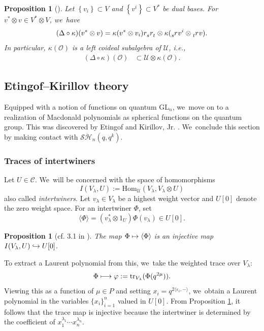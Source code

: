 \documentclass[11pt]{article}
\newcommand{\ie}{i.e.,\xspace}
\newcommand{\cf}{cf.\xspace}
\let\epsilon\varepsilon
\newcommand\mto{\mathchoice{\longmapsto}{\mapsto}{\mapsto}{\mapsto}}
\newcommand\hto{\mathrel{\lhook\joinrel\to}}
\newcommand{\GL}{\mathrm{GL}}
\newtheorem{prop}[thm]{Proposition}
\theoremstyle{definition}
\newcommand{\OO}{\mathcal{O}}
\newcommand{\SHH}{\mathcal{S}\ddot{\mathcal{H}}}
\begin{document}
\begin{prop}[]\label{Coideal}
Let $\left\{ v_i \right\}\subset V$ and $\left\{ v^i \right\}\subset V^*$ be dual bases.
For $v^*\otimes v\in V^*\otimes V$, we~have
\begin{equation}
(\Delta\circ\kappa)(v^*\otimes v)= \kappa(v^*\otimes v_i)\tensor[]{r}{_s}\tensor[]{r}{_t}\otimes\kappa(\tensor[_s]{r}{}v^i\otimes\tensor[_t]{r}{}v).
\label{DeltaKappa}
\end{equation}
In particular, $\kappa(\OO)$ is a left coideal subalgebra of $\mathcal{U}$, \ie
\begin{align*}
(\Delta\circ\kappa)(\OO)&\subset \mathcal{U}\otimes\kappa(\OO).
\end{align*}
\end{prop}

\subsection{Etingof--Kirillov theory}\label{EtKirThy}
Equipped with a notion of functions on quantum $\GL_n$, we~move on to a realization of Macdonald polynomials as spherical functions on the quantum group.
This was discovered by Etingof and Kirillov, Jr. \cite{EtKirQuant}. We~conclude this section by making contact with $\SHH_n(q,q^k)$.

\subsubsection{Traces of intertwiners}
Let $U\in\mathcal{C}$. We~will be concerned with the space of homomorphisms
\[
I(V_\lambda, U):=\mathrm{Hom}_{\mathcal{U}}(V_\lambda,V_\lambda\otimes U)
\]
also called \textit{intertwiners}.
Let $v_\lambda\in V_\lambda$ be a highest weight vector and $U[0]$ denote the zero weight space.
For an intertwiner $\Phi$, set
\[
\langle\Phi\rangle=(v_\lambda^*\otimes 1_U)\Phi(v_\lambda)\in U[0].
\]
\begin{prop}[\cf 3.1 in \cite{EtLatBook}]\label{IntHigh}
The map $\Phi\mto\langle\Phi\rangle$ is an injective map $I(V_\lambda,U)\hto U[0]$.
\end{prop}

To extract a Laurent polynomial from this, we~take the weighted trace over $V_\lambda$:
\[
\Phi\mto\varphi:=\mathrm{tr}_{V_\lambda}(\Phi(q^{2\mu})).
\]
Viewing this as a function of $\mu\in P$ and setting $x_i=q^{2\langle\epsilon_i,-\rangle}$, we~obtain a Laurent polynomial in the variables $\{ x_i \}_{i=1}^n$ valued in $U[0]$.
From Proposition \ref{IntHigh}, it follows that the trace map is injective because the intertwiner is determined by the coefficient of $x_1^{\lambda_1}\cdots x_n^{\lambda_n}$.
\end{document}

